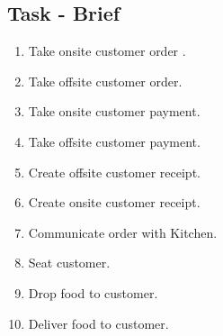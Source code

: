 \documentclass{article}
\begin{document}
\subsection{Task - Brief}
\begin{enumerate}
    \item Take onsite customer order .
    \item Take offsite customer order.
    \item Take onsite customer payment.
    \item Take offsite customer payment.
    \item Create offsite customer receipt.
    \item Create onsite customer receipt.
    \item Communicate order with Kitchen.
    \item Seat customer.
    \item Drop food to customer.
    \item Deliver food to customer.
\end{enumerate}
\end{document}
